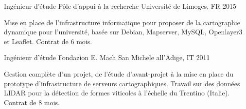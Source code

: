 \begin{cventries}
\cventry
  {Ingénieur d'étude} %
  {Pôle d'appui à la recherche} %
  {Université de Limoges, FR} %
  {2015} %
  {
    \begin{cvitems} %
    Mise en place de l'infrastructure informatique pour proposer de la cartographie dynamique pour l'université, basée sur Debian, Mapserver, MySQL, Openlayer3 et Leaflet. Contrat de 6 mois.
    \end{cvitems}
  }

\cventry
  {Ingénieur d'étude} %
  {Fondazion E. Mach} %
  {San Michele all'Adige, IT} %
  {2011} %
  {
    \begin{cvitems} %
    Gestion complète d'un projet, de l'étude d'avant-projet à la mise en place du prototype d'infrastructure de serveurs cartographiques. Travail sur des données LIDAR pour la détection de formes viticoles à l'échelle du Trentino (Italie). Contrat de 8 mois.
    \end{cvitems}
  }


\end{cventries}
